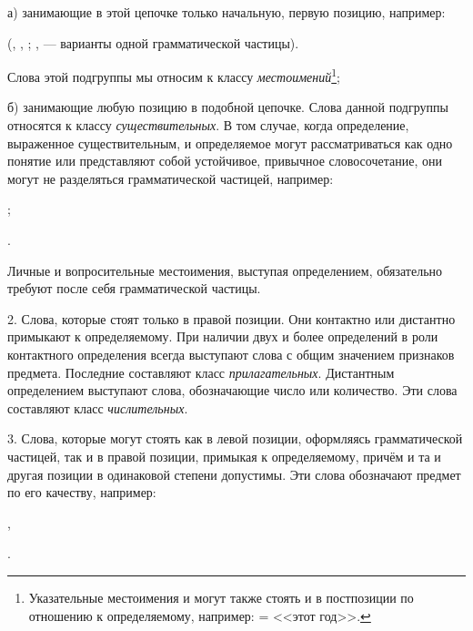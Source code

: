 а) занимающие в этой цепочке только начальную, первую позицию, например:
\begin{prfsample}
    \item {} (, , ; ,  --- варианты одной грамматической частицы).
\end{prfsample}
Слова этой подгруппы мы относим к классу \emph{местоимений}\footnote[24]{Указательные местоимения  и  могут также стоять и в постпозиции по отношению к определяемому, например:  =  <<этот год>>.};

б) занимающие любую позицию в подобной цепочке. Слова данной подгруппы относятся к классу \emph{существительных}. В том случае, когда определение, выраженное существительным, и определяемое могут рассматриваться как одно понятие или представляют собой устойчивое, привычное словосочетание, они могут не разделяться грамматической частицей, например:
\begin{prfsample}
    \item {};
    \item {}.    
\end{prfsample}
Личные и вопросительные местоимения, выступая определением, обязательно требуют после себя грамматической частицы.

2. Слова, которые стоят только в правой позиции. Они контактно или дистантно примыкают к определяемому. При наличии двух и более определений в роли контактного определения всегда выступают слова с общим значением признаков предмета. Последние составляют класс \emph{прилагательных}. Дистантным определением выступают слова, обозначающие число или количество. Эти слова составляют класс \emph{числительных}.

3. Слова, которые могут стоять как в левой позиции, оформляясь грамматической частицей, так и в правой позиции, примыкая к определяемому, причём и та и другая позиции в одинаковой степени допустимы. Эти слова обозначают предмет по его качеству, например:
\begin{prfsample}
    \item {},
    \item {}.    
\end{prfsample}

